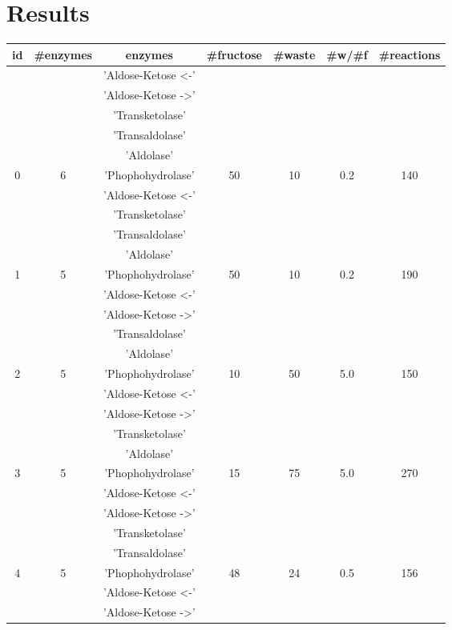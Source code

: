 \section{Results}
\begin{center}
\begin{longtable}{ |c|c|c|c|c|c|c| }
\hline
id & \#enzymes & enzymes & \#fructose & \#waste & \#w\slash\#f & \#reactions \\
\hline
 &  & 'Aldose-Ketose <-' & & & & \\
 &  & 'Aldose-Ketose ->' & & & & \\
 &  & 'Transketolase' & & & & \\
 &  & 'Transaldolase' & & & & \\
 &  & 'Aldolase' & & & & \\
0 & 6 & 'Phophohydrolase' & 50 & 10 & 0.2 & 140\\
 \hline
 &  & 'Aldose-Ketose <-' & & & & \\
 &  & 'Transketolase' & & & & \\
 &  & 'Transaldolase' & & & & \\
 &  & 'Aldolase' & & & & \\
1 & 5 & 'Phophohydrolase' & 50 & 10 & 0.2 & 190\\
 \hline
 &  & 'Aldose-Ketose <-' & & & & \\
 &  & 'Aldose-Ketose ->' & & & & \\
 &  & 'Transaldolase' & & & & \\
 &  & 'Aldolase' & & & & \\
2 & 5 & 'Phophohydrolase' & 10 & 50 & 5.0 & 150\\
 \hline
 &  & 'Aldose-Ketose <-' & & & & \\
 &  & 'Aldose-Ketose ->' & & & & \\
 &  & 'Transketolase' & & & & \\
 &  & 'Aldolase' & & & & \\
3 & 5 & 'Phophohydrolase' & 15 & 75 & 5.0 & 270\\
 \hline
 &  & 'Aldose-Ketose <-' & & & & \\
 &  & 'Aldose-Ketose ->' & & & & \\
 &  & 'Transketolase' & & & & \\
 &  & 'Transaldolase' & & & & \\
4 & 5 & 'Phophohydrolase' & 48 & 24 & 0.5 & 156\\
 \hline
 &  & 'Aldose-Ketose <-' & & & & \\
 &  & 'Aldose-Ketose ->' & & & & \\

\end{longtable}
\end{center}
